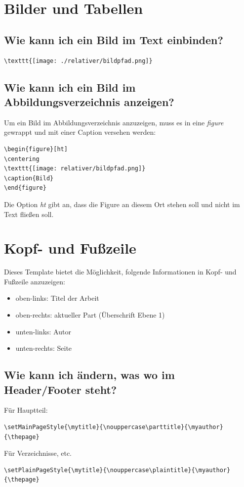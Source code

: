 \documentclass[12pt]{article}
\begin{document}
\section{Bilder und Tabellen}
\subsection{Wie kann ich ein Bild im Text einbinden?}
\begin{verbatim}
\texttt{[image: ./relativer/bildpfad.png]}
\end{verbatim}

\subsection{Wie kann ich ein Bild im Abbildungsverzeichnis anzeigen?}
Um ein Bild im Abbildungsverzeichnis anzuzeigen, muss es in eine \textit{figure} gewrappt und mit einer Caption versehen werden:
\begin{verbatim}
\begin{figure}[ht]
\centering
\texttt{[image: relativer/bildpfad.png]}
\caption{Bild}
\end{figure}
\end{verbatim}
\noindent Die Option \textit{ht} gibt an, dass die Figure an diesem Ort stehen soll und nicht im Text fließen soll.

\section{Kopf- und Fußzeile}
Dieses Template bietet die Möglichkeit, folgende Informationen in Kopf- und Fußzeile anzuzeigen:
\begin{itemize}
\item oben-links: Titel der Arbeit
\item oben-rechts: aktueller Part (Überschrift Ebene 1)
\item unten-links: Autor
\item unten-rechts: Seite
\end{itemize}

\subsection{Wie kann ich ändern, was wo im Header/Footer steht?}
Für Hauptteil:
\begin{verbatim}
\setMainPageStyle{\mytitle}{\nouppercase\parttitle}{\myauthor}{\thepage}
\end{verbatim}
Für Verzeichnisse, etc.
\begin{verbatim}
\setPlainPageStyle{\mytitle}{\nouppercase\plaintitle}{\myauthor}{\thepage}
\end{verbatim}
\end{document}
